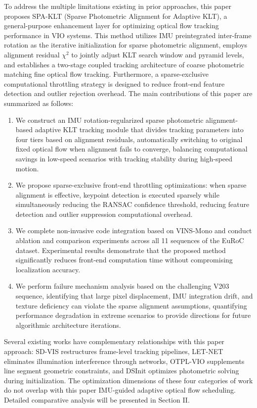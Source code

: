 \documentclass[journal,twoside,web]{ieeecolor}
\begin{document}
To address the multiple limitations existing in prior approaches, this paper proposes SPA-KLT (Sparse Photometric Alignment for Adaptive KLT), a general-purpose enhancement layer for optimizing optical flow tracking performance in VIO systems. This method utilizes IMU preintegrated inter-frame rotation as the iterative initialization for sparse photometric alignment, employs alignment residual $\chi^{2}$ to jointly adjust KLT search window and pyramid levels, and establishes a two-stage coupled tracking architecture of coarse photometric matching fine optical flow tracking. Furthermore, a sparse-exclusive computational throttling strategy is designed to reduce front-end feature detection and outlier rejection overhead. The main contributions of this paper are summarized as follows:

\begin{enumerate}
\item We construct an IMU rotation-regularized sparse photometric alignment-based adaptive KLT tracking module that divides tracking parameters into four tiers based on alignment residuals, automatically switching to original fixed optical flow when alignment fails to converge, balancing computational savings in low-speed scenarios with tracking stability during high-speed motion.
\item We propose sparse-exclusive front-end throttling optimizations: when sparse alignment is effective, keypoint detection is executed sparsely while simultaneously reducing the RANSAC confidence threshold, reducing feature detection and outlier suppression computational overhead.
\item We complete non-invasive code integration based on VINS-Mono and conduct ablation and comparison experiments across all 11 sequences of the EuRoC dataset. Experimental results demonstrate that the proposed method significantly reduces front-end computation time without compromising localization accuracy.
\item We perform failure mechanism analysis based on the challenging V203 sequence, identifying that large pixel displacement, IMU integration drift, and texture deficiency can violate the sparse alignment assumptions, quantifying performance degradation in extreme scenarios to provide directions for future algorithmic architecture iterations.
\end{enumerate}

Several existing works have complementary relationships with this paper approach: SD-VIS restructures frame-level tracking pipelines, LET-NET eliminates illumination interference through networks, OTPL-VIO supplements line segment geometric constraints, and DSInit optimizes photometric solving during initialization. The optimization dimensions of these four categories of work do not overlap with this paper IMU-guided adaptive optical flow scheduling. Detailed comparative analysis will be presented in Section II.
\end{document}

